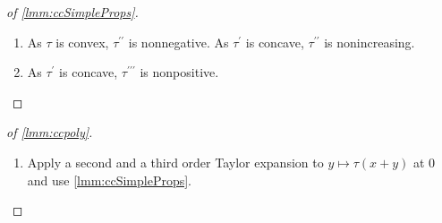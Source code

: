 \documentclass{article}
\newcommand{\lb}{\left(} %
\newcommand{\rb}{\right)} %
\newcommand{\br}[1]{\lb #1 \rb} %
\newcommand{\abs}[1]{\left| #1 \right|} %
\newcommand{\pr}{^\prime}
\newcommand{\prr}{^{\prime\prime}}
\newcommand{\prrr}{^{\prime\prime\prime}}
\newcommand{\dl}{\mathrm{d}}
\newcommand{\equationFullstop}{\, .}
\newcommand{\eqfs}{\equationFullstop}
\newcommand{\equationComma}{\, ,}
\newcommand{\eqcm}{\equationComma}
\newcommand{\tran}{\tau}
\newcommand{\dtran}{\tran\pr}
\newcommand{\ddtran}{\tran\prr}
\newcommand{\dddtran}{\tran\prrr}
\begin{document}
\begin{appendix}
\begin{proof}[of \cref{lmm:ccSimpleProps}]
\begin{enumerate}[label=(\roman*)]
		Fix $\epsilon >0$. As $\dtran$ is continuous, it is uniformly continuous on the compact interval $[0,2]$. Thus, we can find $\delta\in(0,1]$ such that $\abs{\dtran(x)-\dtran(y)} \leq \epsilon$ for all $x,y\in[0,2]$ with $0 < \abs{x-y} \leq \delta$. Thus, for any $h\in (0, \delta]$ and $x \in (0, 1]$,
		\begin{equation}
			\abs{\frac{\tran(x+h)-\tran(x)}{h} - \dtran(x)}
			= 
			\abs{\frac1h \int_0^h \dtran(x+z) - \dtran(x) \dl z}
			\leq
			\epsilon
			\eqfs
		\end{equation}
		Choose $h\in (0, \delta]$ small enough such that,
		\begin{equation}
			\abs{\frac{\tran(h)-\tran(0)}{h} - \partial_+\tran(0)}
			\leq
			\epsilon
			\eqfs
		\end{equation}
		As $\tran$ is continuous and $h$ is fixed, we can find $x\in(0,1]$ small enough such that
		\begin{align*}
			\abs{\tran(x + h) - \tran(h)} &\leq h\epsilon\eqcm\\
			\abs{\tran(x) - \tran(0)} &\leq h\epsilon\eqfs
		\end{align*}
		Thus, we have
		\begin{align*}
			\abs{\dtran(0) - \partial_+\tran(0)}
			&\leq
			\abs{\dtran(0) - \dtran(x)} +
			\abs{\dtran(x) - \partial_+\tran(0)}
			\\&\epsilon +
			\abs{\dtran(x) - \frac{\tran(x+h)-\tran(x)}{h}} +
			\abs{\frac{\tran(x+h)-\tran(x)}{h} - \partial_+\tran(0)}
			\\&2\epsilon +
			\abs{\frac{\tran(x+h)-\tran(x)}{h} - \frac{\tran(h)-\tran(0)}{h}}+
			\abs{\frac{\tran(h)-\tran(0)}{h} - \partial_+\tran(0)}
			\\&3\epsilon +
			\frac1h\br{\abs{\tran(x+h)-\tran(h)}+\abs{\tran(x)-\tran(0)}}
			\\&\leq 5\epsilon
			\eqfs
		\end{align*}
		As $\epsilon > 0$ can be chosen arbitrarily small, $\dtran(0) = \partial_+\tran(0)$.
		\item As $\tran$ is convex, $\ddtran$ is nonnegative. As $\dtran$ is concave, $\ddtran$ is nonincreasing. 
		\item As $\dtran$ is concave, $\dddtran$ is nonpositive.
	\end{enumerate}
\end{proof}
%
%
\begin{proof}[of \cref{lmm:ccpoly}]
	\begin{enumerate}[label=(\roman*)]
		\item Apply a second and a third order Taylor expansion to $y\mapsto \tran(x + y)$ at $0$ and use \cref{lmm:ccSimpleProps}.

\end{enumerate}
\end{proof}
\end{appendix}
\end{document}
